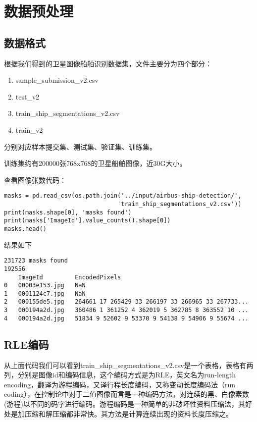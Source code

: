 
\chapter{数据预处理}

\section{数据格式}

根据我们得到的卫星图像船舶识别数据集，文件主要分为四个部分：

\begin{enumerate}
\def\labelenumi{\arabic{enumi}.}
\tightlist
\item
  sample\_submission\_v2.csv
\item
  test\_v2
\item
  train\_ship\_segmentations\_v2.csv
\item
  train\_v2
\end{enumerate}

分别对应样本提交集、测试集、验证集、训练集。

训练集约有200000张768x768的卫星船舶图像，近30G大小。

查看图像张数代码：

\begin{verbatim}
masks = pd.read_csv(os.path.join('../input/airbus-ship-detection/',
                                'train_ship_segmentations_v2.csv'))
print(masks.shape[0], 'masks found')
print(masks['ImageId'].value_counts().shape[0])
masks.head()
\end{verbatim}

结果如下

\begin{verbatim}
231723 masks found
192556
    ImageId         EncodedPixels
0   00003e153.jpg   NaN
1   0001124c7.jpg   NaN
2   000155de5.jpg   264661 17 265429 33 266197 33 266965 33 267733...
3   000194a2d.jpg   360486 1 361252 4 362019 5 362785 8 363552 10 ...
4   000194a2d.jpg   51834 9 52602 9 53370 9 54138 9 54906 9 55674 ...
\end{verbatim}

\section{RLE编码}

从上面代码我们可以看到train\_ship\_segmentations\_v2.csv是一个表格，表格有两列，分别是图像id和编码信息，这个编码方式是为RLE，英文名为run-length
encoding，翻译为游程编码，又译行程长度编码，又称变动长度编码法（run
coding），在控制论中对于二值图像而言是一种编码方法，对连续的黑、白像素数(游程)以不同的码字进行编码。游程编码是一种简单的非破坏性资料压缩法，其好处是加压缩和解压缩都非常快。其方法是计算连续出现的资料长度压缩之。


